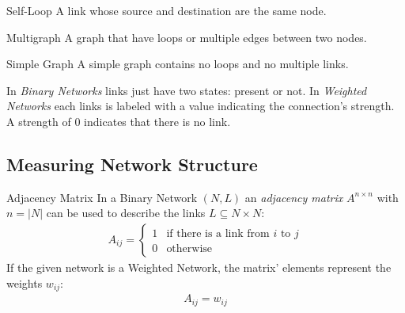 \documentclass[english]{panikzettel}
\begin{document}
\begin{thirdboxl}
	\begin{defi}{Self-Loop}
		A link whose source and destination are the same node.
		
		\centering
	\end{defi}
\end{thirdboxl}
\begin{thirdboxm}
	\begin{defi}{Multigraph}
		A graph that have loops or multiple edges between two nodes.
		
		\centering
	\end{defi}
\end{thirdboxm}
\begin{thirdboxr}
	\begin{defi}{Simple Graph}
		A simple graph contains no loops and no multiple links.
		
		\centering
	\end{defi}
\end{thirdboxr}

In \textit{Binary Networks} links just have two states: present or not. 
In \textit{Weighted Networks} each links is labeled with a value indicating the connection's strength. 
A strength of $ 0 $ indicates that there is no link.

\subsection{Measuring Network Structure}
\begin{defi}{Adjacency Matrix}
	In a Binary Network $ (N,L) $ an \textit{adjacency matrix} $ A^{n \times n} $ with $ n = |N| $ can be used to describe the links $ L \subseteq N \times N $: 
	\begin{align*}
		A_{ij} = \begin{cases}
		1 & \text{if there is a link from } i \text{ to } j \\
		0 & \text{otherwise}
		\end{cases}
	\end{align*}
	If the given network is a Weighted Network, the matrix' elements represent the weights $ w_{ij} $:
	\begin{align*}
		A_{ij} = w_{ij}
	\end{align*}
\end{defi}
\end{document}
